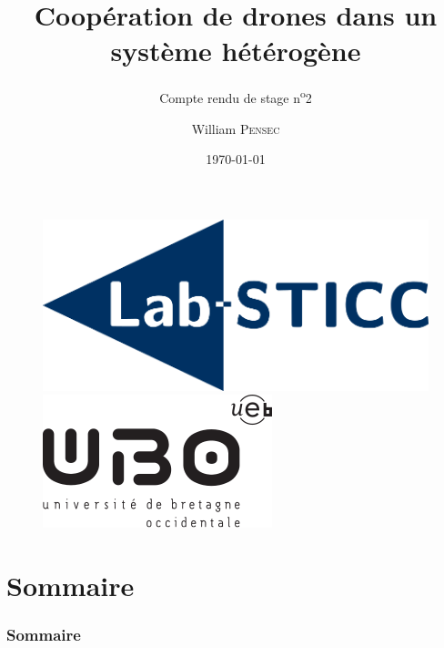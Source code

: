 \documentclass[12pt]{beamer}
\title[Compte rendu de stage n\textsuperscript{o}2]{Coopération de drones dans un système hétérogène}
\subtitle{Compte rendu de stage n\textsuperscript{o}2}
\author{William \textsc{Pensec}}
\institute[Lab-STICC]{Lab-Sticc}
\date{\today}
\begin{document}
	\begin{frame}
		\begin{titlepage}
			\begin{figure}[H]
				\centering
				\includegraphics[scale=.15]{labsticc.png}
				\hspace{3cm}
				\includegraphics[scale=.3]{ubo.png}
			\end{figure}
		\end{titlepage}
	\end{frame}
	
	\section*{Sommaire}
	\begin{frame}
		\frametitle{Sommaire}
		\begin{center}
			\tableofcontents
		\end{center}
	\end{frame}
\end{document}
